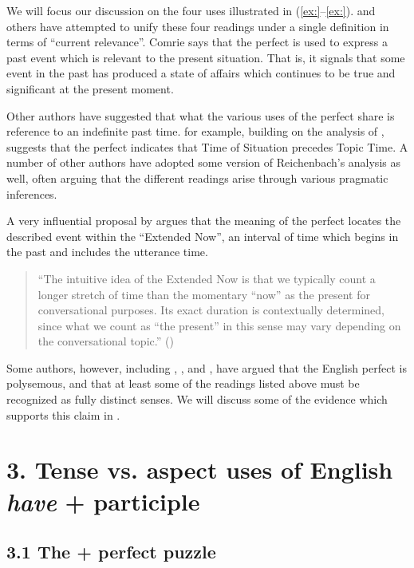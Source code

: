 We will focus our discussion on the four uses illustrated in (\ref{ex:}--\ref{ex:}). \citet{Comrie1976} and others have attempted to unify these four readings under a single definition in terms of “current relevance”. Comrie says that the perfect is used to express a past event which is relevant to the present situation. That is, it signals that some event in the past has produced a state of affairs which continues to be true and significant at the present moment.



Other authors have suggested that what the various uses of the perfect share is reference to an indefinite past time. \citet{Klein1992,Klein1994} for example, building on the analysis of \citet{Reichenbach1947}, suggests that the perfect indicates that Time of Situation precedes Topic Time. A number of other authors have adopted some version of Reichenbach’s analysis as well, often arguing that the different readings arise through various pragmatic inferences.



A very influential proposal by \citet{McCoard1978} argues that the meaning of the perfect locates the described event within the “Extended Now”, an interval of time which begins in the past and includes the utterance time.


\begin{quote}
“The intuitive idea of the Extended Now is that we typically count a longer stretch of time than the momentary “now” as the present for conversational purposes. Its exact duration is contextually determined, since what we count as “the present” in this sense may vary depending on the conversational topic.” (\citealt{Portner2003}) 
\end{quote}


Some authors, however, including \citet{McCawley1971,McCawley1981b}, \citet{Michaelis1994,Michaelis1998}, and \citet{Kiparsky2002}, have argued that the English perfect is polysemous, and that at least some of the readings listed above must be recognized as fully distinct senses. We will discuss some of the evidence which supports this claim in .


\section{3. Tense vs. aspect uses of English \textit{have} + participle}\label{sec:}
\subsection{3.1 The + perfect puzzle}\footnotemark{}\label{sec:}

